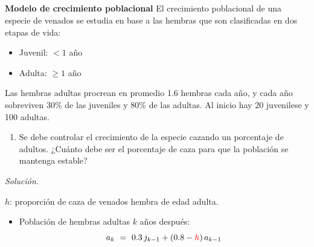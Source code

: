 
\subsection{}

\begin{frame} 
	
	\begin{ejer}{\textbf{Modelo de crecimiento poblacional}} \justifying
		El crecimiento poblacional de una especie de venados se estudia en base a las hembras que son clasificadas en dos etapas de vida:
		
		\vspace{-2mm}
		\begin{multicols}{2}
			\begin{itemize}
				\item Juvenil: $<1$ año
				\item Adulta: $\ge 1$ año
			\end{itemize}
		\end{multicols}
		
		\vspace{-2mm}
		Las hembras adultas procrean en promedio 1.6 hembras cada año, y cada año sobreviven 30\% de las juveniles y 80\% de las adultas. Al inicio hay 20 juvenilese y 100 adultas.
		\begin{enumerate}[$d$]
			\item Se debe controlar el crecimiento de la especie cazando un porcentaje de adultos. ¿Cuánto debe ser el porcentaje de caza para que la población se mantenga estable?
		\end{enumerate}
	\end{ejer}
	
	\textit{Solución.}	
	
	\vspace{1mm}
	
	{\color{red}$h$}: proporción de caza de venados hembra de edad adulta.
	
	\vspace{1mm}
	\begin{itemize}
		\item Población de hembras adultas $k$ años después:
		\[
			a_k \ = \ 0.3\,j_{k-1} + (0.8-{\color{red}h})\,a_{k-1}
		\] 
		

\end{itemize}
\end{frame}
